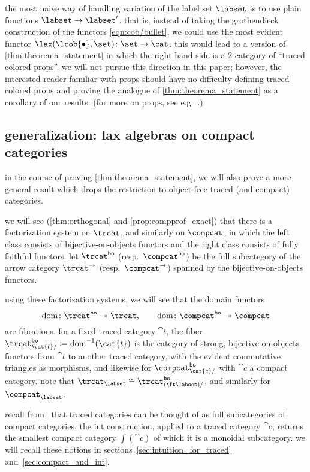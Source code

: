 \documentclass[11pt,oneside,article]{memoir}
\begin{document}
\begin{remark}
   the most naive way of handling variation of the label set $\labset$ is to use plain functions
   $\labset\to\labset'$. that is, instead of taking the grothendieck construction of the functors
   \eqref{eqn:cob/bullet}, we could use the most evident functor
   $\lax(\lcob{\bullet},\set)\colon\set\to\cat$. this would lead to a version of
   \ref{thm:theorema_statement} in which the right hand side is a 2-category of ``traced colored
   props''. we will not pursue this direction in this paper; however, the interested reader familiar
   with props should have no difficulty defining traced colored props and proving the analogue of
   \ref{thm:theorema_statement} as a corollary of our results. (for more on props, see
   e.g.~\cite{hackneyrobertson}.)
\end{remark}

\subsection{generalization: lax algebras on compact categories}

in the course of proving \ref{thm:theorema_statement}, we will also prove a more general result
which drops the restriction to object-free traced (and compact) categories.

we will see (\ref{thm:orthogonal} and \ref{prop:compprof_exact}) that there is a factorization
system on $\trcat$, and similarly on $\compcat$, in which the left class consists of
bijective-on-objects functors and the right class consists of fully faithful functors. let
$\trcat^{\bo}$ (resp.~$\compcat^{\bo}$) be the full subcategory of the arrow category $\trcat^{\to}$
(resp.~$\compcat^{\to}$) spanned by the bijective-on-objects functors.

using these factorization systems, we will see that the domain functors
$$\dom\colon\trcat^{\bo}\twoheadrightarrow\trcat,\qquad\dom\colon\compcat^{\bo}\twoheadrightarrow\compcat$$
are fibrations. for a fixed traced category $\cat{t}$, the fiber
$\trcat^{\bo}_{\cat{t}/}\coloneqq\dom^{-1}(\cat{t})$ is the category of strong, bijective-on-objects
functors from $\cat{t}$ to another traced category, with the evident commutative triangles as
morphisms, and likewise for $\compcat^{\bo}_{\cat{c}/}$ with $\cat{c}$ a compact category. note that
$\trcat_{\labset}\iso\trcat^{\bo}_{(\ft\labset)/}$, and similarly for $\compcat_{\labset}$.

recall from~\cite{joyalstreetverity} that traced categories can be thought of as full subcategories
of compact categories.  the int construction, applied to a traced category $\cat{c}$, returns the
smallest compact category $\int(\cat{c})$ of which it is a monoidal subcategory. we will recall these
notions in sections~\ref{sec:intuition_for_traced} and~\ref{sec:compact_and_int}.
\end{document}
